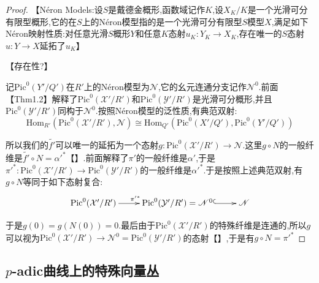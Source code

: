 \begin{enumerate}
\begin{proof}
    	【N\'eron Models:设$S$是戴德金概形,函数域记作$K$,设$X_K/K$是一个光滑可分有限型概形,它的在$S$上的N\'eron模型指的是一个光滑可分有限型$S$模型$X$,满足如下N\'eron映射性质:对任意光滑$S$概形$Y$和任意$K$态射$u_K:Y_K\to X_K$,存在唯一的$S$态射$u:Y\to X$延拓了$u_K$】
    	
    	【存在性?】
    	
    	记$\mathrm{Pic}^0(Y'/Q')$在$R'$上的N\'eron模型为$\mathscr{N}$,它的幺元连通分支记作$\mathscr{N}^0$.前面【Thm1.2】解释了$\mathrm{Pic}^0(\mathcal{X}'/R')$和$\mathrm{Pic}^0(\mathcal{Y}'/R')$是光滑可分概形,并且$\mathrm{Pic}^0(\mathcal{Y}'/R')$同构于$\mathscr{N}^0$.按照N\'eron模型的泛性质,有典范双射:
    	$$\mathrm{Hom}_{R'}(\mathrm{Pic}^0(\mathcal{X}'/R'),\mathscr{N})\cong\mathrm{Hom}_{Q'}(\mathrm{Pic}^0(X'/Q'),\mathrm{Pic}^0(Y'/Q'))$$
    	
    	所以我们的$\widetilde{f'}$可以唯一的延拓为一个态射$g:\mathrm{Pic}^0(\mathcal{X}'/R')\to\mathscr{N}$.这里$g\circ N$的一般纤维是$\widetilde{f'}\circ N={\alpha'}^*$【】.前面解释了$\pi'$的一般纤维是$\alpha'$,于是${\pi'}^*:\mathrm{Pic}^0(\mathcal{X}'/R')\to\mathrm{Pic}^0(\mathcal{Y}'/R')$的一般纤维是${\alpha'}^*$.于是按照上述典范双射,有$g\circ N$等同于如下态射复合:
    	$$\xymatrix{\mathrm{Pic}^0(\mathcal{X}'/R')\ar[r]^{{\pi'}^*}&\mathrm{Pic}^0(\mathcal{Y}'/R')=\mathscr{N}^0\ar@{^{(}->}[r]&\mathscr{N}}$$
    	
    	于是$g(0)=g(N(0))=0$.最后由于$\mathrm{Pic}^0(\mathcal{X}'/R')$的特殊纤维是连通的,所以$g$可以视为$\mathrm{Pic}^0(\mathcal{X}'/R')\to\mathscr{N}^0=\mathrm{Pic}^0(\mathcal{Y}'/R')$的态射【】,于是有$g\circ N={\pi'}^*$
    \end{proof}
\end{enumerate}

\subsection{$p$-adic曲线上的特殊向量丛}

